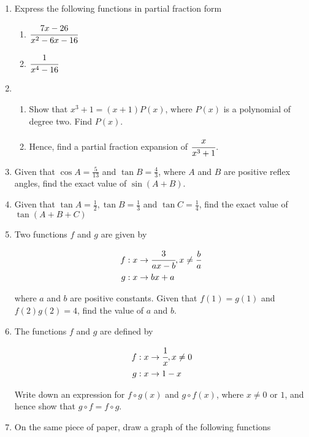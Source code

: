 \documentclass[letterpaper]{article}
\begin{document}
\begin{enumerate}

\item Express the following functions in partial fraction form

\begin{enumerate}
\item $\cfrac{7x - 26}{x^2 - 6x - 16}$
\item $\cfrac{1}{x^4 - 16}$
\end{enumerate}

\item 
\begin{enumerate}
\item Show that $x^3 + 1 = (x+1)P(x)$, where $P(x)$ is a polynomial of degree two. Find $P(x)$. \item Hence, find a partial fraction expansion of $\cfrac{x}{x^3 + 1}$.
\end{enumerate}

\item Given that $\cos A = \frac{5}{13}$ and $\tan B = \frac{4}{3}$, where $A$ and $B$ are positive reflex angles, find the exact value of $\sin(A+B)$.

\item Given that $\tan A = \frac{1}{2}, \tan B = \frac{1}{3}$ and $\tan C = \frac{1}{4}$, find the exact value of $\tan (A + B + C)$

\item Two functions $f$ and $g$ are given by 

\begin{align*}
f &: x \to \cfrac{3}{ax - b}, x \ne \frac{b}{a} \\
g &: x \to bx + a
\end{align*}

where $a$ and $b$ are positive constants. Given that $f(1) = g(1)$ and $f(2)g(2) = 4$, find the value of $a$ and $b$.

\item The functions $f$ and $g$ are defined by

\begin{align*}
f &: x \to \cfrac{1}{x}, x \ne 0 \\
g &: x \to 1 - x
\end{align*}

Write down an expression for $f \circ g(x)$ and $g \circ f(x)$, where $x \ne 0$ or $1$, and hence show that $g \circ f = f \circ g$.

\item On the same piece of paper, draw a graph of the following functions


\end{enumerate}
\end{document}
